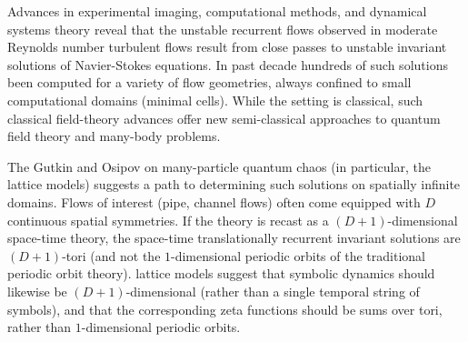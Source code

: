 

Advances in experimental imaging, computational methods, and
dynamical systems theory reveal that the unstable recurrent flows
observed in moderate Reynolds number turbulent flows result from
close passes to unstable invariant solutions of Navier-Stokes
equations. In past decade hundreds of such solutions been computed
for a variety of flow geometries, always confined to small
computational domains (minimal cells). While the setting is classical,
such classical field-theory advances offer new semi-classical
approaches to quantum field theory and many-body problems.

The Gutkin and Osipov on many-particle quantum chaos
(in particular, the {\catlatt} lattice models) suggests a path to
determining such solutions on spatially infinite domains. Flows of
interest (pipe, channel flows) often come equipped with $D$
continuous spatial symmetries. If the theory is recast as a
$(D+1)$-dimensional space-time theory, the space-time
translationally recurrent invariant solutions are $(D+1)$-tori (and
not the $1$-dimensional periodic orbits of the traditional periodic
orbit theory). {\catLatt} lattice models suggest that symbolic
dynamics should likewise be $(D+1)$-dimensional (rather than a
single temporal string of symbols), and that the corresponding zeta
functions should be sums over tori, rather than $1$-dimensional
periodic orbits.
